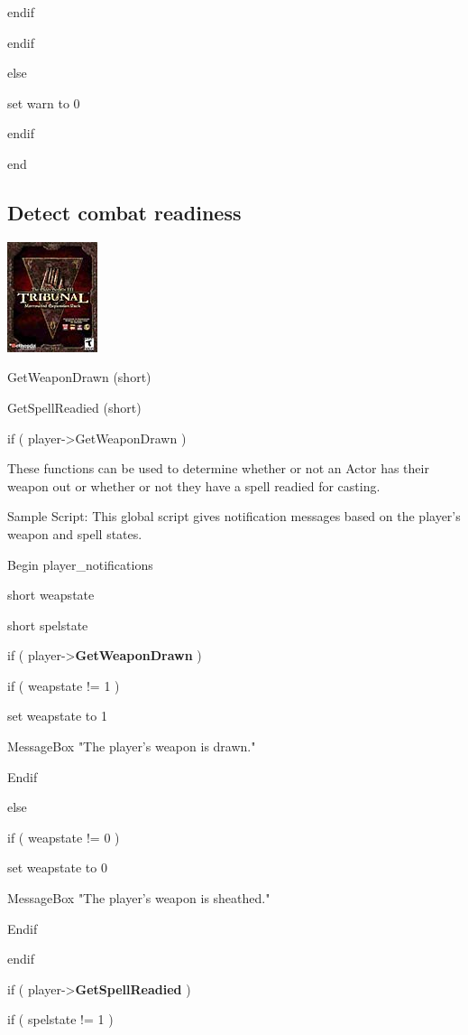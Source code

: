 \documentclass[
]{article}
\begin{document}
endif

endif

else

set warn to 0

endif

end

\hypertarget{detect-combat-readiness}{%
\subsection{Detect combat readiness}\label{detect-combat-readiness}}

\includegraphics{media/image6.png}

GetWeaponDrawn (short)

GetSpellReadied (short)

if ( player-\textgreater GetWeaponDrawn )

These functions can be used to determine whether or not an Actor has
their weapon out or whether or not they have a spell readied for
casting.

Sample Script: This global script gives notification messages based on
the player's weapon and spell states.

Begin player\_notifications

short weapstate

short spelstate

if ( player-\textgreater{}\textbf{GetWeaponDrawn} )

if ( weapstate != 1 )

set weapstate to 1

MessageBox "The player's weapon is drawn."

Endif

else

if ( weapstate != 0 )

set weapstate to 0

MessageBox "The player's weapon is sheathed."

Endif

endif

if ( player-\textgreater{}\textbf{GetSpellReadied} )

if ( spelstate != 1 )
\end{document}
